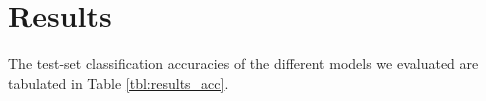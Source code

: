 \section{Results}
\label{sec:results}
The test-set classification accuracies of the different models we evaluated are tabulated in Table \ref{tbl:results_acc}.

